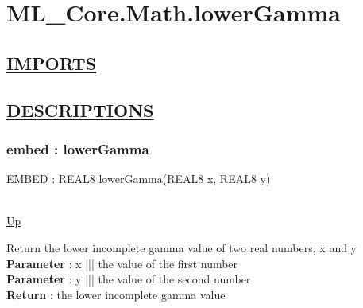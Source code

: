 \chapter*{ML\_Core.Math.lowerGamma}
\hypertarget{ML_Core.Math.lowerGamma}{}

\section*{\underline{IMPORTS}}

\section*{\underline{DESCRIPTIONS}}
\subsection*{embed : lowerGamma}
\hypertarget{ecldoc:ml_core.math.lowergamma}{EMBED : REAL8 lowerGamma(REAL8 x, REAL8 y)} \\
\hyperlink{ecldoc:}{Up} \\
\par
Return the lower incomplete gamma value of two real numbers, x and y \\
\textbf{Parameter} : x ||| the value of the first number \\
\textbf{Parameter} : y ||| the value of the second number \\
\textbf{Return} : the lower incomplete gamma value \\

